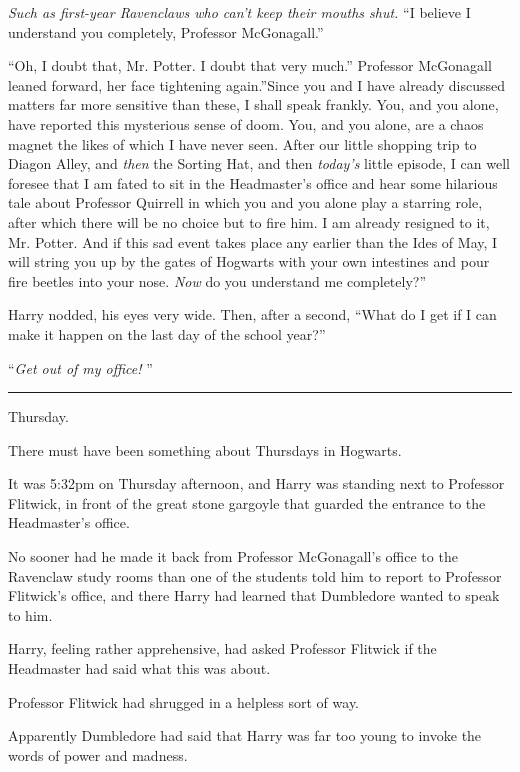 \emph{Such as first-year Ravenclaws who can't keep their mouths shut.}
``I believe I understand you completely, Professor McGonagall.''

``Oh, I doubt that, Mr. Potter. I doubt that very much.'' Professor
McGonagall leaned forward, her face tightening again.''Since you and I
have already discussed matters far more sensitive than these, I shall
speak frankly. You, and you alone, have reported this mysterious sense
of doom. You, and you alone, are a chaos magnet the likes of which I
have never seen. After our little shopping trip to Diagon Alley, and
\emph{then} the Sorting Hat, and then \emph{today's} little episode, I
can well foresee that I am fated to sit in the Headmaster's office and
hear some hilarious tale about Professor Quirrell in which you and you
alone play a starring role, after which there will be no choice but to
fire him. I am already resigned to it, Mr. Potter. And if this sad event
takes place any earlier than the Ides of May, I will string you up by
the gates of Hogwarts with your own intestines and pour fire beetles
into your nose. \emph{Now} do you understand me completely?''

Harry nodded, his eyes very wide. Then, after a second, ``What do I get
if I can make it happen on the last day of the school year?''

``\emph{Get out of my office!} ''

\begin{center}\rule{3in}{0.4pt}\end{center}

Thursday.

There must have been something about Thursdays in Hogwarts.

It was 5:32pm on Thursday afternoon, and Harry was standing next to
Professor Flitwick, in front of the great stone gargoyle that guarded
the entrance to the Headmaster's office.

No sooner had he made it back from Professor McGonagall's office to the
Ravenclaw study rooms than one of the students told him to report to
Professor Flitwick's office, and there Harry had learned that Dumbledore
wanted to speak to him.

Harry, feeling rather apprehensive, had asked Professor Flitwick if the
Headmaster had said what this was about.

Professor Flitwick had shrugged in a helpless sort of way.

Apparently Dumbledore had said that Harry was far too young to invoke
the words of power and madness.

